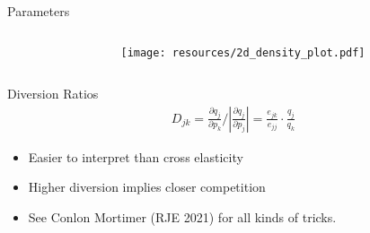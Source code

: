 \begin{frame}{Parameters}
\begin{columns}
\begin{column}{0.4\textwidth}
\scalebox{0.33}{

}
\end{column}
\begin{column}{0.6\textwidth}
\texttt{[image: resources/2d\_density\_plot.pdf]}
\end{column}
\end{columns}
\end{frame}



\begin{frame}{Diversion Ratios}
\begin{align*}
D_{jk} = \frac{\partial q_j}{\partial p_k}/\left|\frac{\partial q_j}{\partial p_j}\right| = \frac{e_{jk}}{e_{jj}} \cdot \frac{q_j}{q_k}
\end{align*}
\begin{itemize}
  \item Easier to interpret than cross elasticity
  \item Higher diversion implies closer competition
  \item See Conlon Mortimer (RJE 2021) for all kinds of tricks.
\end{itemize}
\end{frame}
